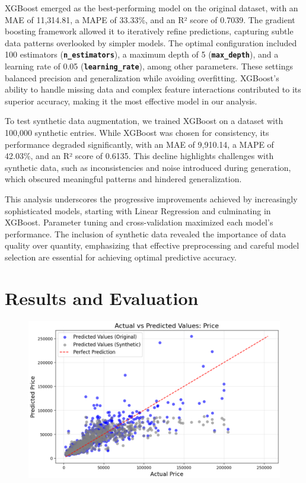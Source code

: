 \documentclass[a4paper,oneside,bibliography=totoc]{scrbook}
\begin{document}
XGBoost emerged as the best-performing model on the original dataset, with an MAE of 11,314.81, a MAPE of 33.33\%, and an R² score of 0.7039. The gradient boosting framework allowed it to iteratively refine predictions, capturing subtle data patterns overlooked by simpler models. The optimal configuration included 100 estimators (\textbf{\texttt{n\_estimators}}), a maximum depth of 5 (\textbf{\texttt{max\_depth}}), and a learning rate of 0.05 (\textbf{\texttt{learning\_rate}}), among other parameters. These settings balanced precision and generalization while avoiding overfitting. XGBoost's ability to handle missing data and complex feature interactions contributed to its superior accuracy, making it the most effective model in our analysis.

To test synthetic data augmentation, we trained XGBoost on a dataset with 100,000 synthetic entries. While XGBoost was chosen for consistency, its performance degraded significantly, with an MAE of 9,910.14, a MAPE of 42.03\%, and an R² score of 0.6135. This decline highlights challenges with synthetic data, such as inconsistencies and noise introduced during generation, which obscured meaningful patterns and hindered generalization.

This analysis underscores the progressive improvements achieved by increasingly sophisticated models, starting with Linear Regression and culminating in XGBoost. Parameter tuning and cross-validation maximized each model's performance. The inclusion of synthetic data revealed the importance of data quality over quantity, emphasizing that effective preprocessing and careful model selection are essential for achieving optimal predictive accuracy.

\chapter{Results and Evaluation}
\label{cha:resultsAndEvaluation}

\begin{figure}
	\includegraphics[width=\linewidth]{images/xgb_results_mixed.png}
	\centering
\end{figure}
\end{document}
